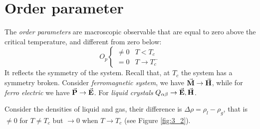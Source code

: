 \documentclass[../main/main.tex]{subfiles}
\begin{document}
\section{Order parameter}
The \emph{order parameters} are macroscopic observable that are equal to zero above the critical temperature, and different from zero below:
\begin{equation}
O_p
  \begin{cases}
  \neq 0 & T<T_c \\
  = 0 & T \rightarrow T_c^-
  \end{cases}
\label{eq:}
\end{equation}
It reflects the symmetry of the system. Recall that, at \( T_c \) the system has a symmetry broken. Consider \emph{ferromagnetic system}, we have \( \va{M} \rightarrow \va{H}   \), while for \emph{ferro electric} we have \( \va{P} \rightarrow \va{E}   \). For \emph{liquid crystals} \( Q_{\alpha \beta } \rightarrow \va{E},\va{H}   \).

Consider the densities of liquid and gas, their difference is \( \Delta \rho = \rho _{l} - \rho _{g} \), that is \( \neq 0 \) for \( T \neq T_c \) but \( \rightarrow 0 \) when \( T \rightarrow T_c \) (see Figure \ref{fig:3_2}).
\end{document}
